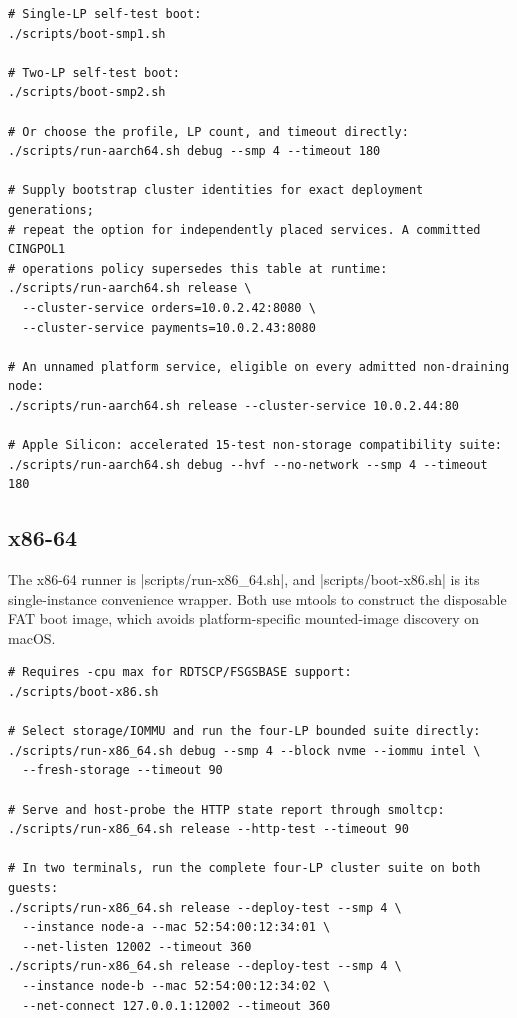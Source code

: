 \begin{verbatim}
# Single-LP self-test boot:
./scripts/boot-smp1.sh

# Two-LP self-test boot:
./scripts/boot-smp2.sh

# Or choose the profile, LP count, and timeout directly:
./scripts/run-aarch64.sh debug --smp 4 --timeout 180

# Supply bootstrap cluster identities for exact deployment generations;
# repeat the option for independently placed services. A committed CINGPOL1
# operations policy supersedes this table at runtime:
./scripts/run-aarch64.sh release \
  --cluster-service orders=10.0.2.42:8080 \
  --cluster-service payments=10.0.2.43:8080

# An unnamed platform service, eligible on every admitted non-draining node:
./scripts/run-aarch64.sh release --cluster-service 10.0.2.44:80

# Apple Silicon: accelerated 15-test non-storage compatibility suite:
./scripts/run-aarch64.sh debug --hvf --no-network --smp 4 --timeout 180
\end{verbatim}

\subsection{x86-64}

The x86-64 runner is \repofile|scripts/run-x86_64.sh|, and
\repofile|scripts/boot-x86.sh| is its single-instance convenience wrapper.
Both use mtools to construct the disposable FAT boot image, which avoids
platform-specific mounted-image discovery on macOS.

\begin{verbatim}
# Requires -cpu max for RDTSCP/FSGSBASE support:
./scripts/boot-x86.sh

# Select storage/IOMMU and run the four-LP bounded suite directly:
./scripts/run-x86_64.sh debug --smp 4 --block nvme --iommu intel \
  --fresh-storage --timeout 90

# Serve and host-probe the HTTP state report through smoltcp:
./scripts/run-x86_64.sh release --http-test --timeout 90

# In two terminals, run the complete four-LP cluster suite on both guests:
./scripts/run-x86_64.sh release --deploy-test --smp 4 \
  --instance node-a --mac 52:54:00:12:34:01 \
  --net-listen 12002 --timeout 360
./scripts/run-x86_64.sh release --deploy-test --smp 4 \
  --instance node-b --mac 52:54:00:12:34:02 \
  --net-connect 127.0.0.1:12002 --timeout 360
\end{verbatim}

